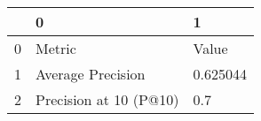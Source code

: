 \begin{tabular}{lll}
\toprule
{} &                       0 &         1 \\
\midrule
0 &                  Metric &     Value \\
1 &       Average Precision &  0.625044 \\
2 &  Precision at 10 (P@10) &       0.7 \\
\bottomrule
\end{tabular}
